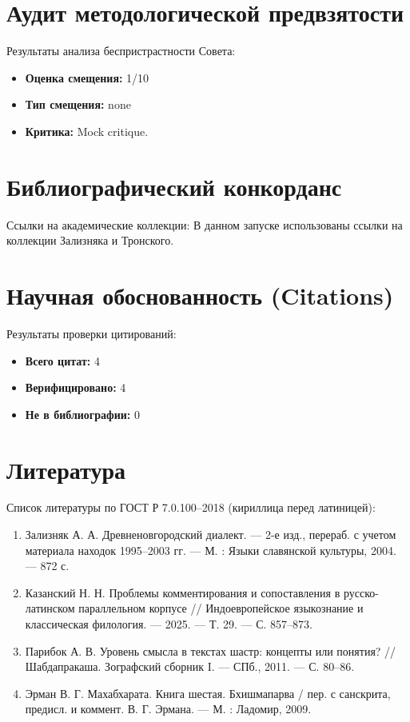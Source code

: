 \documentclass{article}
\begin{document}
\section{Аудит методологической предвзятости}
Результаты анализа беспристрастности Совета:
\begin{itemize}
    \item \textbf{Оценка смещения:} 1/10
    \item \textbf{Тип смещения:} none
    \item \textbf{Критика:} Mock critique.
\end{itemize}

\section{Библиографический конкорданс}
Ссылки на академические коллекции:
В данном запуске использованы ссылки на коллекции Зализняка и Тронского.

\section{Научная обоснованность (Citations)}
Результаты проверки цитирований:
\begin{itemize}
    \item \textbf{{Всего цитат:}} 4
    \item \textbf{{Верифицировано:}} 4
    \item \textbf{{Не в библиографии:}} 0
\end{itemize}

\section{Литература}
Список литературы по ГОСТ Р 7.0.100--2018 (кириллица перед латиницей):
\begin{enumerate}
    \item Зализняк А. А. Древненовгородский диалект. — 2-е изд., перераб. с учетом материала находок 1995–2003 гг. — М. : Языки славянской культуры, 2004. — 872 с.
    \item Казанский Н. Н. Проблемы комментирования и сопоставления в русско-латинском параллельном корпусе // Индоевропейское языкознание и классическая филология. — 2025. — Т. 29. — С. 857–873.
    \item Парибок А. В. Уровень смысла в текстах шастр: концепты или понятия? // Шабдапракаша. Зографский сборник I. — СПб., 2011. — С. 80–86.
    \item Эрман В. Г. Махабхарата. Книга шестая. Бхишмапарва / пер. с санскрита, предисл. и коммент. В. Г. Эрмана. — М. : Ладомир, 2009.
\end{enumerate}
\end{document}

